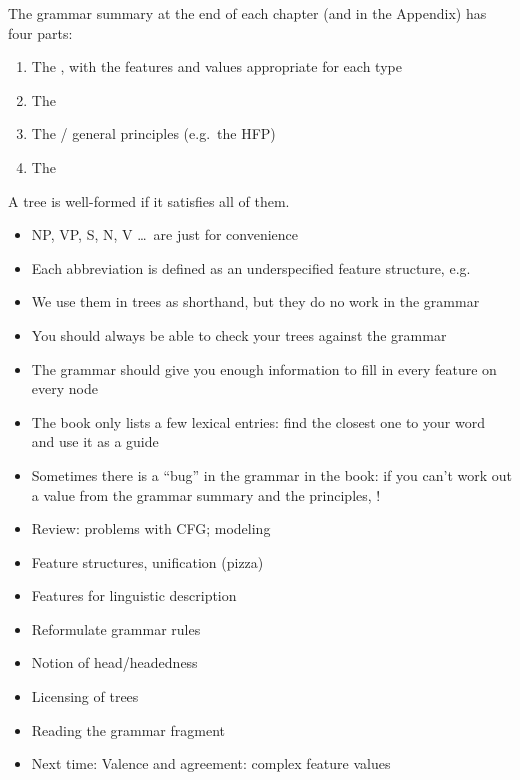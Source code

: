 \documentclass[a4paper,landscape,headrule,footrule]{foils}
\begin{document}
The grammar summary at the end of each chapter (and in the Appendix)
has four parts:
\begin{enumerate}
\item The , with the features and values
  appropriate for each type
\item The 
\item The  / general principles
  (e.g.\ the HFP)
\item The 
\end{enumerate}
A tree is well-formed if it satisfies all of them.

\begin{itemize}
\item NP, VP, S, N, V \ldots\ are just for convenience
\item Each abbreviation is defined as an underspecified feature
  structure, e.g.
  \begin{center}
  \end{center}
\item We use them in trees as shorthand, but they do no work in the
  grammar
\end{itemize}

\begin{itemize}
\item You should always be able to check your trees against the grammar
\item The grammar should give you enough information to fill in every
  feature on every node
\item The book only lists a few lexical entries: find the closest one
  to your word and use it as a guide
\item Sometimes there is a ``bug'' in the grammar in the book: if you
  can't work out a value from the grammar summary and the principles,
  !
\end{itemize}

\begin{itemize}
\item Review: problems with CFG; modeling
\item Feature structures, unification (pizza)
\item Features for linguistic description
\item Reformulate grammar rules
\item Notion of head/headedness
\item Licensing of trees
\item Reading the grammar fragment
\item Next time: Valence and agreement: complex feature values
\end{itemize}
\end{document}
